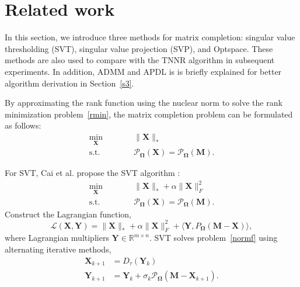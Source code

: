 \documentclass{article}
\begin{document}
{\section{Related work}
\label{s2}


In this section, we introduce three methods for matrix completion: singular value thresholding (SVT)\cite{cai.shen200810},  singular value projection (SVP)\cite{jain.dhillon2010}, and Optspace\cite{keshavan.montanari200906}. These methods are also used to compare with the TNNR algorithm in subsequent experiments. In addition, ADMM and APDL is is briefly explained for better algorithm derivation in Section~\ref{s3}.

By approximating the rank function using the nuclear norm to solve the rank
minimization problem~\eqref{rmin},  the matrix completion problem can be formulated as follows:
\begin{equation}
    \begin{aligned}
        \min_{\mathbf X}\qquad&\quad \lVert\mathbf X\rVert_* \\
        \text{s.t.}\qquad&\quad  \mathcal{P}_{\mathbf \Omega}(\mathbf X) =  \mathcal{P}_{\mathbf\Omega}(\mathbf M).
    \end{aligned}
    \label{normf}
\end{equation}

For SVT, Cai et al. propose the SVT algorithm :
\begin{equation}
    \begin{aligned}
        \min_{\mathbf X}\qquad&\quad \lVert\mathbf X\rVert_* + \alpha\lVert \mathbf X\rVert_F^2\\
        \text{s.t.}\qquad&\quad\mathcal{P}_{\mathbf\Omega}(\mathbf X) =  \mathcal{P}_{\mathbf\Omega}(\mathbf M).
    \end{aligned}
\end{equation}
Construct the Lagrangian function,
\begin{equation}
    \mathcal{L}(\mathbf X,\mathbf Y) = \lVert\mathbf X\rVert_* + \alpha\lVert \mathbf X\rVert_F^2 + \langle \mathbf Y, P_{\mathbf\Omega}(\mathbf M-\mathbf X) \rangle,
\end{equation}
where Lagrangian multipliers $\mathbf Y \in \mathbb{R}^{m \times n}$. SVT solves problem~\eqref{normf} using alternating iterative methods,
\begin{equation}
    \begin{aligned}
        \mathbf X_{k+1} & = D_\tau(\mathbf Y_{k})\\
        \mathbf Y_{k+1}& = \mathbf Y_{k} + \sigma_k\mathcal{P}_{\mathbf\Omega}(\mathbf M-\mathbf X_{k+1}).
    \end{aligned}
\end{equation}

}
\end{document}
